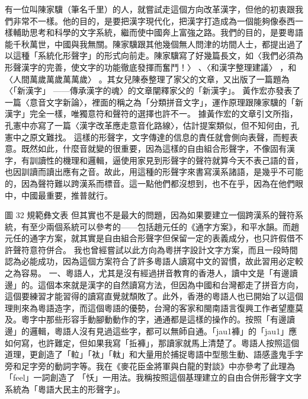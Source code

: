 \documentclass[a5paper, 12pt, openany]{book} %
\begin{document}
有一位叫陳家驥（筆名千里）的人，就嘗試走這個方向改革漢字，但他的初衷跟我們非常不一樣。他的目的，是要把漢字現代化，把漢字打造成為一個能夠像泰西一樣輔助思考和科學的文字系統，繼而使中國奔上富強之路。我們的目的，是要粵語能千秋萬世，中國與我無關。陳家驥跟其他幾個無人問津的坊間人士，都提出過了以這種「系統化形聲字」的形式向前走。陳家驥寫了好幾篇長文，如〈我們必須為形聲漢字的完善，使文字的功能徹底發揮而奮鬥！〉 、〈和漢字整理建議〉 ，和〈人間萬歲萬歲萬萬歲〉 。其女兒陳泰整理了家父的文章，又出版了一篇題為〈「新漢字」 ——傳承漢字的魂〉的文章闡釋家父的「新漢字」。 黃作宏亦發表了一篇〈意音文字新論〉，裡面的稱之為「分類拼音文字」，運作原理跟陳家驥的「新漢字」完全一樣，唯獨意符和聲符的選擇也許不一。  據黃作宏的文章引文所指，孔憲中亦寫了一篇〈漢字改革應走意音化路線〉，估計提案類似，但不知何由，孔憲中之原文難找。 
這樣的形聲字，文字傳達的信息的責任就會側向表聲，而輕表意。既然如此，什麼音就變的很重要，因為這樣的自由組合形聲字，不像固有漢字，有訓讀性的機理和邏輯，逼使用家見到形聲字的聲符就算今天不表己語的音，也因訓讀而讀出應有之音。故此，用這種的形聲字來書寫漢系諸語，是幾乎不可能的，因為聲符難以跨漢系而標音。這一點他們都沒想到，也不在乎，因為在他們眼中，中國最重要，推普就行。 

圖 32 規範彝文表
但其實也不是最大的問題，因為如果要建立一個跨漢系的聲符系統，有至少兩個系統可以參考的——包括趙元任的《通字方案》，和平水韻。而趙元任的通字方案，就其實是自由組合形聲字但保留一定的表義成分，也只許假借不許聲符意符併合。
我也曾經嘗試以此方向為粵拼字設計文字方案，而且一段時間認為必能成功，因為這個方案符合了許多粵語人讀寫中文的習慣，故此習用必定較之為容易。 一、粵語人，尤其是沒有經過拼音教育的香港人，讀中文是「有邊讀邊」的。這個本來就是漢字的自然讀寫方法，但因為中國和台灣都走了拼音方向，這個要練習才能習得的讀寫直覺就頹敗了。此外，香港的粵語人也已開始了以這個理則來為粵語造字，而這個粵語的優勢，台灣的客家和閩南語言復興工作者望塵莫及。粵字中那些形容手動腳動動作的字，通通都是這樣的操作的。按照「有邊讀邊」的邏輯，粵語人沒有見過這些字，都可以無師自通。「jau1褲」的「jau1」應如何寫，也許難定，但如果我寫「拞褲」，那讀家就馬上清楚了。粵語人按照這個道理，更創造了「𨋢」「𧘹」「軚」和大量用於捕捉粵語中型態生動、語感盞鬼手字旁和足字旁的動詞字等。我在《麥花臣金將軍與白龍的對談》中亦參考了此理為「feel」一詞創造了 「㤇」一用法。我稱按照這個基理建立的自由合併形聲字文字系統為「粵語大民主的形聲字」。
\end{document}
